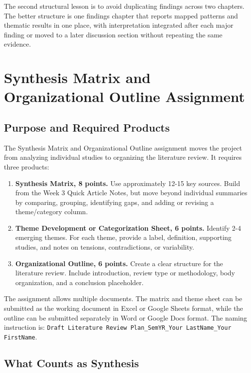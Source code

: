 \documentclass[10pt,letterpaper]{article}
\begin{document}
The second structural lesson is to avoid duplicating findings across two chapters. The better structure is one findings chapter that reports mapped patterns and thematic results in one place, with interpretation integrated after each major finding or moved to a later discussion section without repeating the same evidence.

\section{Synthesis Matrix and Organizational Outline Assignment}

\subsection{Purpose and Required Products}

The Synthesis Matrix and Organizational Outline assignment moves the project from analyzing individual studies to organizing the literature review. It requires three products:

\begin{enumerate}
\item \textbf{Synthesis Matrix, 8 points.} Use approximately 12-15 key sources. Build from the Week 3 Quick Article Notes, but move beyond individual summaries by comparing, grouping, identifying gaps, and adding or revising a theme/category column.
\item \textbf{Theme Development or Categorization Sheet, 6 points.} Identify 2-4 emerging themes. For each theme, provide a label, definition, supporting studies, and notes on tensions, contradictions, or variability.
\item \textbf{Organizational Outline, 6 points.} Create a clear structure for the literature review. Include introduction, review type or methodology, body organization, and a conclusion placeholder.
\end{enumerate}

The assignment allows multiple documents. The matrix and theme sheet can be submitted as the working document in Excel or Google Sheets format, while the outline can be submitted separately in Word or Google Docs format. The naming instruction is: \texttt{Draft Literature Review Plan\_SemYR\_Your LastName\_Your FirstName}.

\subsection{What Counts as Synthesis}
\end{document}
